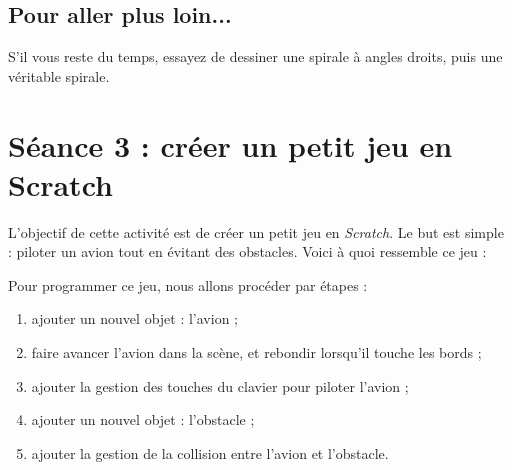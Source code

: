 \subsection{Pour aller plus loin...}

S'il vous reste du temps, essayez de dessiner une spirale à angles droits, puis une véritable spirale.



%
%
%
%









\section{Séance 3 : créer un petit jeu en Scratch}\label{ficheScratch3}


L'objectif de cette activité est de créer un petit jeu en \emph{Scratch}. Le but est simple : piloter un avion tout en évitant des obstacles. Voici à quoi ressemble ce jeu :


Pour programmer ce jeu, nous allons procéder par étapes :
\begin{enumerate}
\item ajouter un nouvel objet : l'avion ;
\item faire avancer l'avion dans la scène, et rebondir lorsqu'il touche les bords ;
\item ajouter la gestion des touches du clavier pour piloter l'avion ;
\item ajouter un nouvel objet : l'obstacle ;
\item ajouter la gestion de la collision entre l'avion et l'obstacle.
\end{enumerate}


